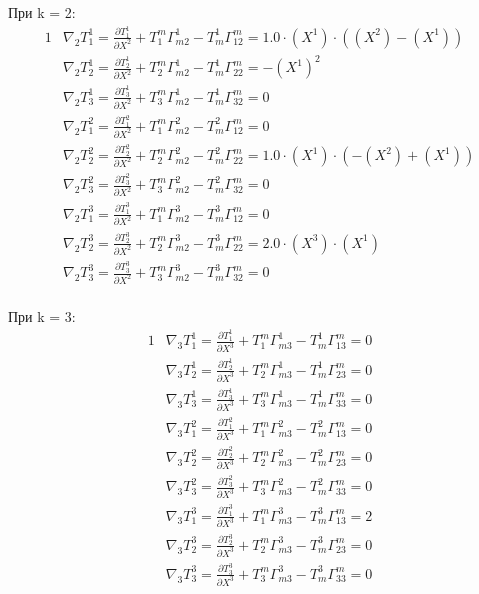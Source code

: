 \documentclass[a4paper, 12pt, oneside]{article}
\begin{document}
При k = 2:\\
\begin{alignat*}{1}
  & \nabla_2T^1_1 = \frac{\partial T^1_1}{\partial X^2} + T^m_1\Gamma^1_{m2} - T^1_m\Gamma^m_{12} = 1.0\cdot (X^1)\cdot ((X^2) - (X^1)) \\
  & \nabla_2T^1_2 = \frac{\partial T^1_2}{\partial X^2} + T^m_2\Gamma^1_{m2} - T^1_m\Gamma^m_{22} = -(X^1)^2 \\
  & \nabla_2T^1_3 = \frac{\partial T^1_3}{\partial X^2} + T^m_3\Gamma^1_{m2} - T^1_m\Gamma^m_{32} = 0 \\
  & \nabla_2T^2_1 = \frac{\partial T^2_1}{\partial X^2} + T^m_1\Gamma^2_{m2} - T^2_m\Gamma^m_{12} = 0 \\
  & \nabla_2T^2_2 = \frac{\partial T^2_2}{\partial X^2} + T^m_2\Gamma^2_{m2} - T^2_m\Gamma^m_{22} = 1.0\cdot (X^1)\cdot (-(X^2) + (X^1)) \\
  & \nabla_2T^2_3 = \frac{\partial T^2_3}{\partial X^2} + T^m_3\Gamma^2_{m2} - T^2_m\Gamma^m_{32} = 0 \\
  & \nabla_2T^3_1 = \frac{\partial T^3_1}{\partial X^2} + T^m_1\Gamma^3_{m2} - T^3_m\Gamma^m_{12} = 0 \\
  & \nabla_2T^3_2 = \frac{\partial T^3_2}{\partial X^2} + T^m_2\Gamma^3_{m2} - T^3_m\Gamma^m_{22} = 2.0\cdot (X^3)\cdot (X^1) \\
  & \nabla_2T^3_3 = \frac{\partial T^3_3}{\partial X^2} + T^m_3\Gamma^3_{m2} - T^3_m\Gamma^m_{32} = 0 
\end{alignat*}\\
При k = 3:\\
\begin{alignat*}{1}
  & \nabla_3T^1_1 = \frac{\partial T^1_1}{\partial X^3} + T^m_1\Gamma^1_{m3} - T^1_m\Gamma^m_{13} = 0 \\
  & \nabla_3T^1_2 = \frac{\partial T^1_2}{\partial X^3} + T^m_2\Gamma^1_{m3} - T^1_m\Gamma^m_{23} = 0 \\
  & \nabla_3T^1_3 = \frac{\partial T^1_3}{\partial X^3} + T^m_3\Gamma^1_{m3} - T^1_m\Gamma^m_{33} = 0 \\
  & \nabla_3T^2_1 = \frac{\partial T^2_1}{\partial X^3} + T^m_1\Gamma^2_{m3} - T^2_m\Gamma^m_{13} = 0 \\
  & \nabla_3T^2_2 = \frac{\partial T^2_2}{\partial X^3} + T^m_2\Gamma^2_{m3} - T^2_m\Gamma^m_{23} = 0 \\
  & \nabla_3T^2_3 = \frac{\partial T^2_3}{\partial X^3} + T^m_3\Gamma^2_{m3} - T^2_m\Gamma^m_{33} = 0 \\
  & \nabla_3T^3_1 = \frac{\partial T^3_1}{\partial X^3} + T^m_1\Gamma^3_{m3} - T^3_m\Gamma^m_{13} = 2 \\
  & \nabla_3T^3_2 = \frac{\partial T^3_2}{\partial X^3} + T^m_2\Gamma^3_{m3} - T^3_m\Gamma^m_{23} = 0 \\
  & \nabla_3T^3_3 = \frac{\partial T^3_3}{\partial X^3} + T^m_3\Gamma^3_{m3} - T^3_m\Gamma^m_{33} = 0 
\end{alignat*}\\
\end{document}
